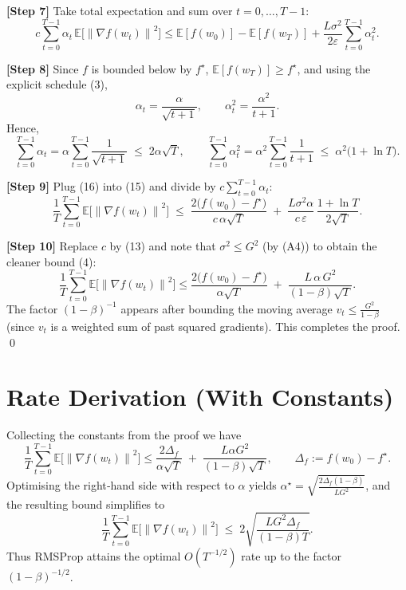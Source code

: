 \documentclass{article}
\newcommand{\E}{\mathbb{E}}
\newcommand{\norm}[1]{\left\lVert#1\right\rVert}
\begin{document}
\noindent\textbf{[Step 7]} Take total expectation and sum over $t=0,\dots,T-1$:
\[
c\sum_{t=0}^{T-1}\alpha_t\,\E\!\bigl[\norm{\nabla f(w_t)}^{2}\bigr]
\le
\E[f(w_0)]-\E[f(w_T)]
+\frac{L\sigma^{2}}{2\varepsilon}
\sum_{t=0}^{T-1}\alpha_t^{2}.
\tag{15}
\]

\noindent\textbf{[Step 8]} Since $f$ is bounded below by $f^\star$,
$\E[f(w_T)]\ge f^\star$, and using the explicit schedule (3),
\[
\alpha_t=\frac{\alpha}{\sqrt{t+1}},\qquad
\alpha_t^{2}=\frac{\alpha^{2}}{t+1}.
\]
Hence,
\[
\sum_{t=0}^{T-1}\alpha_t
= \alpha\sum_{t=0}^{T-1}\frac{1}{\sqrt{t+1}}
\;\le\;
2\alpha\sqrt{T},
\qquad
\sum_{t=0}^{T-1}\alpha_t^{2}
= \alpha^{2}\sum_{t=0}^{T-1}\frac{1}{t+1}
\;\le\;
\alpha^{2}\bigl(1+\ln T\bigr).
\tag{16}
\]

\noindent\textbf{[Step 9]} Plug (16) into (15) and divide by $c\sum_{t=0}^{T-1}\alpha_t$:
\[
\frac{1}{T}\sum_{t=0}^{T-1}\E\!\bigl[\norm{\nabla f(w_t)}^{2}\bigr]
\;\le\;
\frac{2\bigl(f(w_0)-f^\star\bigr)}{c\,\alpha\sqrt{T}}
\;+\;
\frac{L\sigma^{2}\alpha}{c\,\varepsilon}\,
\frac{1+\ln T}{2\sqrt{T}} .
\tag{17}
\]

\noindent\textbf{[Step 10]} Replace $c$ by (13) and note that $\sigma^{2}\le G^{2}$
(by (A4)) to obtain the cleaner bound (4):
\[
\frac{1}{T}\sum_{t=0}^{T-1}\E\!\bigl[\norm{\nabla f(w_t)}^{2}\bigr]
\le
\frac{2\bigl(f(w_0)-f^\star\bigr)}{\alpha\sqrt{T}}
\;+\;
\frac{L\,\alpha\,G^{2}}{(1-\beta)\sqrt{T}} .
\]
The factor $(1-\beta)^{-1}$ appears after bounding the moving average
$v_t\le\frac{G^{2}}{1-\beta}$ (since $v_t$ is a weighted sum of past squared
gradients).  This completes the proof. \qed

\section*{Rate Derivation (With Constants)}
Collecting the constants from the proof we have
\[
\boxed{
\frac{1}{T}\sum_{t=0}^{T-1}\E\!\bigl[\norm{\nabla f(w_t)}^{2}\bigr]
\le
\frac{2\Delta_f}{\alpha\sqrt{T}}
\;+\;
\frac{L\alpha G^{2}}{(1-\beta)\sqrt{T}},
}
\qquad
\Delta_f:=f(w_0)-f^\star .
\]
Optimising the right‑hand side with respect to $\alpha$ yields
$\alpha^\star = \sqrt{\frac{2\Delta_f(1-\beta)}{L G^{2}}}$,
and the resulting bound simplifies to
\[
\frac{1}{T}\sum_{t=0}^{T-1}\E\!\bigl[\norm{\nabla f(w_t)}^{2}\bigr]
\;\le\;
2\sqrt{\frac{L G^{2}\Delta_f}{(1-\beta)T}} .
\]
Thus RMSProp attains the optimal $O(T^{-1/2})$ rate up to the factor
$(1-\beta)^{-1/2}$.
\end{document}
